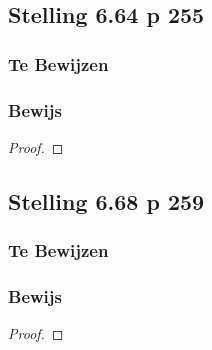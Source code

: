 \documentclass[lineaire_algebra_oplossingen.tex]{subfiles}
\begin{document}
\subsection{Stelling 6.64 p 255}
\subsubsection*{Te Bewijzen}
\subsubsection*{Bewijs}
\begin{proof}

\end{proof}

\subsection{Stelling 6.68 p 259}
\subsubsection*{Te Bewijzen}
\subsubsection*{Bewijs}
\begin{proof}

\end{proof}
\end{document}
